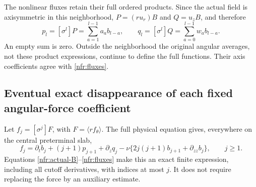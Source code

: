 The nonlinear fluxes retain their full ordered products. Since the
actual field is axisymmetric in this neighborhood,
\(P=(ru_r)B\) and \(Q=u_zB\), and therefore
\begin{equation}\label{nfr:fluxes}
 p_l=[\sigma^l]P=\sum_{a=1}^{l-1}a_a b_{l-a},\qquad
 q_l=[\sigma^l]Q=\sum_{a=0}^{l-1}w_a b_{l-a}.
\end{equation}
An empty sum is zero. Outside the neighborhood the original angular
averages, not these product expressions, continue to define the full
functions. Their axis coefficients agree with \eqref{nfr:fluxes}.

\subsection{Eventual exact disappearance of each fixed angular-force coefficient}

Let \(f_j=[\sigma^j]F\), with \(F=\langle rf_\theta\rangle\).
The full physical equation gives, everywhere on the central preterminal slab,
\begin{equation}\label{nfr:force}
 f_j=\partial_tb_j+(j+1)p_{j+1}+\partial_zq_j
       -\nu\{2j(j+1)b_{j+1}+\partial_{zz}b_j\},\qquad j\geq1.
\end{equation}
Equations \eqref{nfr:actual-B}--\eqref{nfr:fluxes} make this an exact
finite expression, including all cutoff derivatives, with indices at most
\(j\). It does not require replacing the force by an auxiliary estimate.

